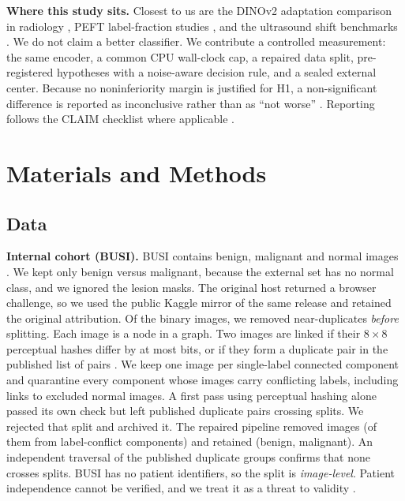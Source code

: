 \documentclass[conference,a4paper]{IEEEtran}
\begin{document}
\textbf{Where this study sits.} Closest to us are the DINOv2 adaptation
comparison in radiology \cite{baharoon2023radiology}, PEFT label-fraction
studies \cite{lian2024less,dutt2024missed}, and the ultrasound shift benchmarks
\cite{ramollari2026shift,wang2026datasetshift}. We do not claim a better
classifier. We contribute a controlled measurement: the same encoder, a common
CPU wall-clock cap, a repaired data split, pre-registered hypotheses with a
noise-aware decision rule, and a sealed external center. Because no
noninferiority margin is justified for H1, a non-significant difference is
reported as inconclusive rather than as ``not worse''
\cite{lakens2017equivalence}. Reporting follows the CLAIM checklist where
applicable \cite{tejani2024claim}.

\section{Materials and Methods}
\label{sec:methods}

\subsection{Data}

\textbf{Internal cohort (BUSI).} BUSI contains \valDataBusiBenignRaw benign,
\valDataBusiMalignantRaw malignant and \valDataBusiNormalExcluded normal images
\cite{aldhabyani2020busi}. We kept only benign versus malignant, because the
external set has no normal class, and we ignored the lesion masks. The original
host returned a browser challenge, so we used the public Kaggle mirror of the
same release and retained the original attribution. Of the
\valDataBusiBinaryRaw binary images, we removed near-duplicates \emph{before}
splitting. Each image is a node in a graph. Two images are linked if their
$8\times8$ perceptual hashes differ by at most \valDataBusiHamming bits, or if
they form a duplicate pair in the published list of \valDataBusiPublishedPairs
pairs \cite{pawlowska2023critique}. We keep one image per single-label connected
component and quarantine every component whose images carry conflicting labels,
including links to excluded normal images. A first pass using perceptual hashing
alone passed its own check but left \valDataPhashOnlyCrossingPairs published
duplicate pairs crossing splits. We rejected that split and archived it. The
repaired pipeline removed \valDataBusiRemoved images
(\valDataBusiConflictImages of them from \valDataBusiConflictComponents
label-conflict components) and retained \valDataBusiRetained
(\valDataBusiRetainedBenign benign, \valDataBusiRetainedMalignant malignant). An
independent traversal of the published duplicate groups confirms that none
crosses splits. BUSI has no patient identifiers, so the split is
\emph{image-level}. Patient independence cannot be verified, and we treat it as
a threat to validity \cite{ucar2026leakage}.
\end{document}
